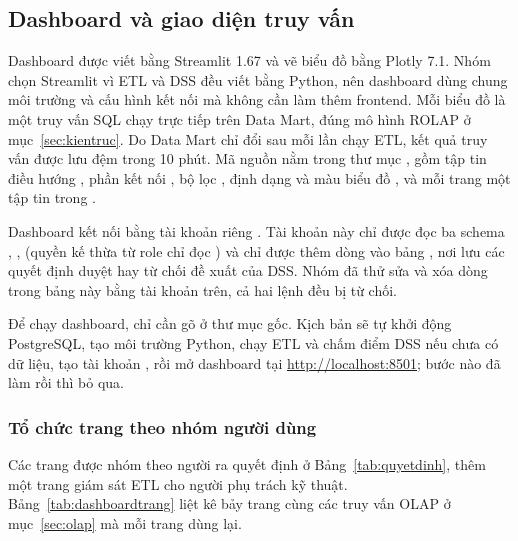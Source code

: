 \subsection{Dashboard và giao diện truy vấn}\label{sec:dashboard}

Dashboard được viết bằng Streamlit 1.67 và vẽ biểu đồ bằng Plotly 7.1. Nhóm chọn Streamlit vì ETL và DSS đều viết bằng Python, nên dashboard dùng chung môi trường và cấu hình kết nối mà không cần làm thêm frontend. Mỗi biểu đồ là một truy vấn SQL chạy trực tiếp trên Data Mart, đúng mô hình ROLAP ở mục~\ref{sec:kientruc}. Do Data Mart chỉ đổi sau mỗi lần chạy ETL, kết quả truy vấn được lưu đệm trong 10 phút. Mã nguồn nằm trong thư mục , gồm tập tin điều hướng , phần kết nối , bộ lọc , định dạng và màu biểu đồ , và mỗi trang một tập tin trong .

Dashboard kết nối bằng tài khoản riêng . Tài khoản này chỉ được đọc ba schema , ,  (quyền kế thừa từ role chỉ đọc ) và chỉ được thêm dòng vào bảng , nơi lưu các quyết định duyệt hay từ chối đề xuất của DSS. Nhóm đã thử sửa và xóa dòng trong bảng này bằng tài khoản trên, cả hai lệnh đều bị từ chối.

Để chạy dashboard, chỉ cần gõ  ở thư mục gốc. Kịch bản sẽ tự khởi động PostgreSQL, tạo môi trường Python, chạy ETL và chấm điểm DSS nếu chưa có dữ liệu, tạo tài khoản , rồi mở dashboard tại \url{http://localhost:8501}; bước nào đã làm rồi thì bỏ qua.

\subsubsection{Tổ chức trang theo nhóm người dùng}

Các trang được nhóm theo người ra quyết định ở Bảng~\ref{tab:quyetdinh}, thêm một trang giám sát ETL cho người phụ trách kỹ thuật. Bảng~\ref{tab:dashboardtrang} liệt kê bảy trang cùng các truy vấn OLAP ở mục~\ref{sec:olap} mà mỗi trang dùng lại.

